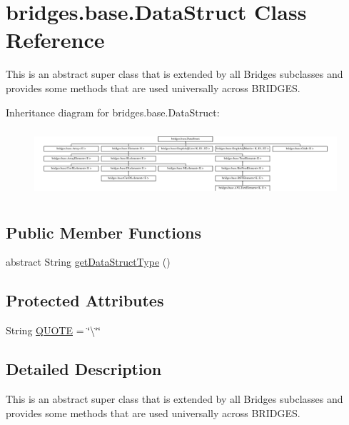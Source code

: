 \hypertarget{classbridges_1_1base_1_1_data_struct}{}\section{bridges.\+base.\+Data\+Struct Class Reference}
\label{classbridges_1_1base_1_1_data_struct}


This is an abstract super class that is extended by all Bridges subclasses and provides some methods that are used universally across B\+R\+I\+D\+G\+E\+S.  


Inheritance diagram for bridges.\+base.\+Data\+Struct\+:\begin{figure}[H]
\begin{center}
\leavevmode
\includegraphics[height=2.526316cm]{classbridges_1_1base_1_1_data_struct}
\end{center}
\end{figure}
\subsection*{Public Member Functions}
\begin{DoxyCompactItemize}
\item 
abstract String \hyperlink{classbridges_1_1base_1_1_data_struct_a3bae9d0d68a85e517a34be482e90fdd4}{get\+Data\+Struct\+Type} ()
\end{DoxyCompactItemize}
\subsection*{Protected Attributes}
\begin{DoxyCompactItemize}
\item 
String \hyperlink{classbridges_1_1base_1_1_data_struct_aac4a6ea28f44676274120ba1dddafc1f}{Q\+U\+O\+T\+E} = \char`\"{}\textbackslash{}\char`\"{}\char`\"{}
\end{DoxyCompactItemize}


\subsection{Detailed Description}
This is an abstract super class that is extended by all Bridges subclasses and provides some methods that are used universally across B\+R\+I\+D\+G\+E\+S. 

